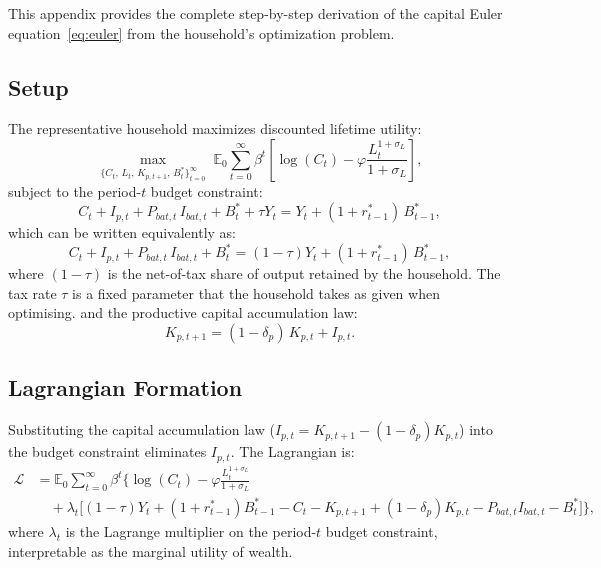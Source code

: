 	This appendix provides the complete step-by-step derivation of the capital Euler equation~\eqref{eq:euler} from the household's optimization problem.
	
	\subsection*{Setup}
	
	The representative household maximizes discounted lifetime utility:
	\begin{equation*}
		\max_{\{C_t,\, L_t,\, K_{p,t+1},\, B^*_t\}_{t=0}^{\infty}} \;
		\mathbb{E}_0 \sum_{t=0}^{\infty} \beta^t
		\left[\log(C_t) - \varphi \frac{L_t^{1+\sigma_L}}{1+\sigma_L}\right],
	\end{equation*}
	subject to the period-$t$ budget constraint:
	\begin{equation*}
		C_t + I_{p,t} + P_{bat,t}\,I_{bat,t} + B^*_t + \tau Y_t
		= Y_t + (1+r^*_{t-1})\,B^*_{t-1},
	\end{equation*}
	which can be written equivalently as:
	\begin{equation*}
		C_t + I_{p,t} + P_{bat,t}\,I_{bat,t} + B^*_t
		= (1-\tau) Y_t + (1+r^*_{t-1})\,B^*_{t-1},
	\end{equation*}
	where $(1-\tau)$ is the net-of-tax share of output retained by the household. The tax rate $\tau$ is a fixed parameter that the household takes as given when optimising.
	and the productive capital accumulation law:
	\begin{equation*}
		K_{p,t+1} = (1-\delta_p)\,K_{p,t} + I_{p,t}.
	\end{equation*}
	
	\subsection*{Lagrangian Formation}
	
	Substituting the capital accumulation law ($I_{p,t} = K_{p,t+1} - (1-\delta_p)K_{p,t}$) into the budget constraint eliminates $I_{p,t}$. The Lagrangian is:
	\begin{align*}
		\mathcal{L} &= \mathbb{E}_0 \sum_{t=0}^{\infty} \beta^t \Bigg\{
		\log(C_t) - \varphi \frac{L_t^{1+\sigma_L}}{1+\sigma_L} \\
		&\quad + \lambda_t \Big[(1-\tau)Y_t + (1+r^*_{t-1})B^*_{t-1} - C_t
		- K_{p,t+1} + (1-\delta_p)K_{p,t}
		- P_{bat,t}I_{bat,t} - B^*_t\Big]
		\Bigg\},
	\end{align*}
	where $\lambda_t$ is the Lagrange multiplier on the period-$t$ budget constraint, interpretable as the marginal utility of wealth.
	
